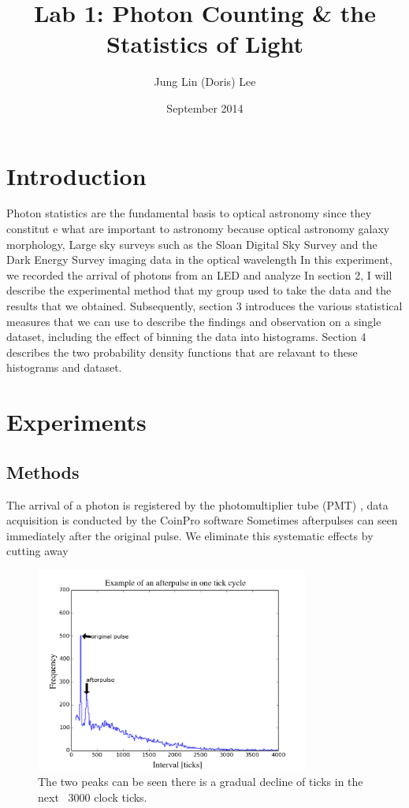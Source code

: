 \documentclass{article}
\title{Lab 1: Photon Counting \& the Statistics of Light}
\author{Jung Lin (Doris) Lee}
\date{September 2014}
\begin{document}
\maketitle

\section{Introduction\label{intro}}
\indent Photon statistics are the fundamental basis to optical astronomy since they constitut e what 
are important to astronomy because 
optical astronomy 
galaxy morphology, 
Large sky surveys such as the Sloan Digital Sky Survey and the Dark Energy Survey   imaging data in the optical wavelength
\indent In this experiment, we recorded the arrival of photons from an LED and analyze
 In section 2, I will describe the experimental method that my group used to take the data and the results that we obtained. Subsequently, section 3 introduces the various statistical measures that we can use to describe the findings and observation on  a single dataset, including the effect of binning the data into histograms. Section 4 describes the two probability density functions that are relavant to these histograms and dataset.
\section{Experiments\label{experiment}}
	\subsection{Methods}
The arrival of a photon is registered by the photomultiplier tube (PMT) , data acquisition is conducted by the CoinPro software
Sometimes afterpulses can seen immediately after the original pulse.  We eliminate this systematic effects by cutting away 

\begin{figure}[h]
\centering
\includegraphics[width=0.8\textwidth]{figures/afterpulse}
\caption{The two peaks can be seen  there is a gradual decline of ticks in the next ~3000 clock ticks.}
\label{afterpulse}
\end{figure}
\end{document}
